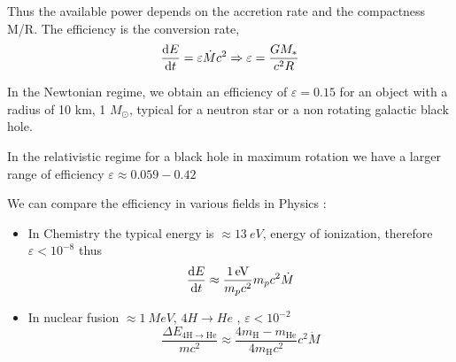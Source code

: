 \documentclass[10pt,a4paper,english,draft]{article}
\begin{document}
Thus the available power depends on the accretion rate and the compactness M/R. The efficiency is the conversion rate,
\begin{equation}
 \frac{\mathrm{d} E}{\mathrm{d} t} = \varepsilon \dot{M} c^{2} \Rightarrow \varepsilon = \frac{GM_*}{c^{2}R}
\end{equation}

In the Newtonian regime, we obtain an efficiency of $\varepsilon = 0.15$ for an object with a radius of 10 km, 1 $M_{\odot}$, typical for a neutron star or a non rotating galactic black hole.

In the relativistic regime for a black hole in maximum rotation we have a larger range of efficiency $\varepsilon \approx 0.059-0.42$

We can compare the efficiency in various fields in Physics :
\begin{itemize}
  \item In Chemistry the typical energy is $\approx \SI{13}{eV}$, energy of ionization, therefore $\varepsilon < 10^{-8}$ thus
  \begin{equation}
  \frac{\mathrm{d} E}{\mathrm{d} t} \approx \frac{\SI{1}{eV}}{m_{p}c^{2}} m_{p}c^{2}\dot{M}
  \end{equation}
  \item In nuclear fusion $\approx \SI{1}{MeV}$, $4H \rightarrow He$ , $\varepsilon < 10^{-2}$
  \begin{equation}
    \frac {\Delta E_{4 \mathrm{H} \rightarrow \mathrm{He}}}{mc^{2}} \approx \dfrac{4m_\mathrm{H}-m_\mathrm{He}}{4m_\mathrm{H}c^{2}} c^{2}\dot{M}
  \end{equation}
\end{itemize}
\end{document}
